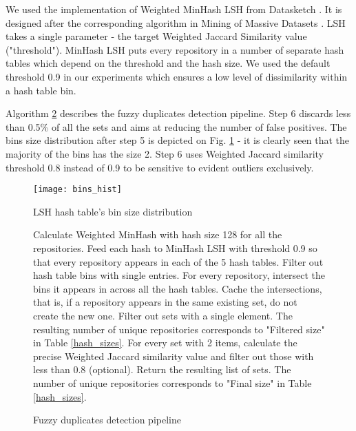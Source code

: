 \documentclass[conference,10pt]{IEEEtran}
\begin{document}
We used the implementation of Weighted MinHash LSH from Datasketch \cite{datasketch}. It is designed after the corresponding algorithm in Mining of Massive Datasets \cite{Leskovec:2014:MMD:2787930}. LSH takes a single parameter - the target Weighted Jaccard Similarity value ("threshold"). MinHash LSH puts every repository in a number of separate hash tables which depend on the threshold and the hash size. We used the default threshold 0.9 in our experiments which ensures a low level of dissimilarity within a hash table bin.

Algorithm \ref{lsh} describes the fuzzy duplicates detection pipeline. Step 6 discards less than 0.5\% of all the sets and aims at reducing the number of false positives. The bins size distribution after step 5 is depicted on Fig. \ref{bins_hist} - it is clearly seen that the majority of the bins has the size 2. Step 6 uses Weighted Jaccard similarity threshold 0.8 instead of 0.9 to be sensitive to evident outliers exclusively.

\begin{figure}
\caption{LSH hash table's bin size distribution}
\label{bins_hist}
\begin{center}
\texttt{[image: bins\_hist]}
\end{center}
\end{figure}

\begin{figure}
\caption{Fuzzy duplicates detection pipeline}
\label{lsh}
\begin{algorithmic}[1]
\State Calculate Weighted MinHash with hash size 128 for all the repositories.
\State Feed each hash to MinHash LSH with threshold 0.9 so that every repository appears in each of the 5 hash tables.
\State Filter out hash table bins with single entries.
\State For every repository, intersect the bins it appears in across all the hash tables. Cache the intersections, that is, if a repository appears in the same existing set, do not create the new one.
\State Filter out sets with a single element. The resulting number of unique repositories corresponds to "Filtered size" in Table \ref{hash_sizes}.
\State For every set with 2 items, calculate the precise Weighted Jaccard similarity value and filter out those with less than 0.8 (optional).
\State Return the resulting list of sets. The number of unique repositories corresponds to "Final size" in Table \ref{hash_sizes}.
\end{algorithmic}
\end{figure}
\end{document}
